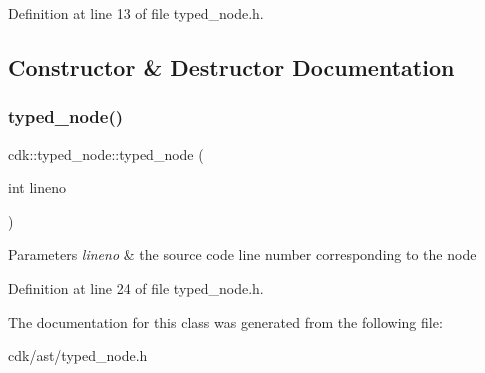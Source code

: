 Definition at line 13 of file typed\+\_\+node.\+h.



\subsection{Constructor \& Destructor Documentation}
\mbox{\label{classcdk_1_1typed__node_a8dc140896ce9464793806837d6bcd626}} 
\subsubsection{typed\+\_\+node()}
{\footnotesize\ttfamily cdk\+::typed\+\_\+node\+::typed\+\_\+node (\begin{DoxyParamCaption}\item[{int}]{lineno }\end{DoxyParamCaption})\hspace{0.3cm}{\ttfamily [inline]}}


\begin{DoxyParams}{Parameters}
{\em lineno} & the source code line number corresponding to the node \\
\hline
\end{DoxyParams}


Definition at line 24 of file typed\+\_\+node.\+h.



The documentation for this class was generated from the following file\+:\begin{DoxyCompactItemize}
\item 
cdk/ast/typed\+\_\+node.\+h\end{DoxyCompactItemize}
